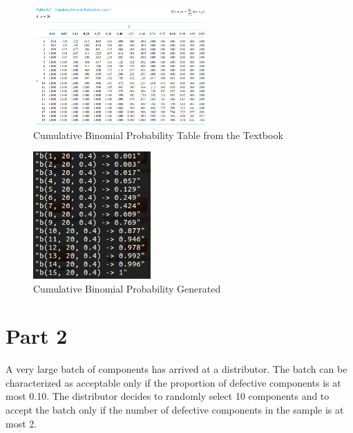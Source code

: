 \documentclass{article}
\begin{document}
            \begin{figure}[h]
                \begin{center}
                    \includegraphics[width=0.6\textwidth]{figures/binom_table.png}
                    \caption{Cumulative Binomial Probability Table from the Textbook} \label{fig:binom_table}
                \end{center}
            \end{figure}


            \begin{figure}[h]
                \begin{center}
                    \includegraphics[width=0.4\textwidth]{figures/cumProb.png}
                    \caption{Cumulative Binomial Probability Generated} \label{fig:cumProb}
                \end{center}
            \end{figure}

    \section{Part 2}
    A very large batch of components has arrived at a distributor. The batch can be characterized as acceptable only if the proportion of defective components is at most 0.10. The distributor decides to randomly select 10 components and to accept the batch only if the number of defective components in the sample is at most 2.
\end{document}
